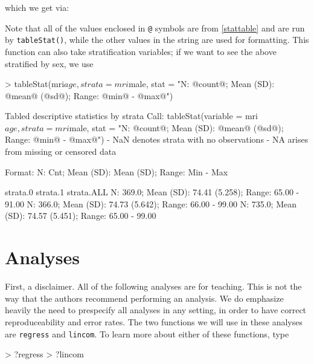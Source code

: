 \documentclass[landscape]{article}
\renewenvironment{Schunk}{\vspace{\topsep}}{\vspace{\topsep}}
\begin{document}
which we get via:
\begin{Schunk}
\end{Schunk}

Note that all of the values enclosed in \texttt{@} symbols are from \ref{stattable} and are run by \texttt{tableStat()}, while the other values in the string are used for formatting. This function can also take stratification variables; if we want to see the above stratified by sex, we use
\begin{Schunk}
\begin{Sinput}
> tableStat(mri$age, strata = mri$male, stat = "N: @count@; Mean (SD): @mean@ (@sd@); Range: @min@ - @max@")
\end{Sinput}
\begin{Soutput}
Tabled descriptive statistics by strata
Call:
      tableStat(variable = mri$age, strata = mri$male, stat = "N: @count@; Mean (SD): @mean@ (@sd@); Range: @min@ - @max@") 
            - NaN denotes strata with no observations
            - NA arises from missing or censored data

Format:  N: Cnt; Mean (SD): Mean (SD); Range: Min - Max 

                                                strata.0                                                 strata.1                                               strata.ALL 
N: 369.0; Mean (SD): 74.41 (5.258); Range: 65.00 - 91.00 N: 366.0; Mean (SD): 74.73 (5.642); Range: 66.00 - 99.00 N: 735.0; Mean (SD): 74.57 (5.451); Range: 65.00 - 99.00 
\end{Soutput}
\end{Schunk}


\section{Analyses}
First, a disclaimer. All of the following analyses are for teaching. This is not the way that the authors recommend performing an analysis. We do emphasize heavily the need to prespecify all analyses in any setting, in order to have correct reproduceability and error rates. The two functions we will use in these analyses are \texttt{regress} and \texttt{lincom}. To learn more about either of these functions, type
\begin{Schunk}
\begin{Sinput}
> ?regress
> ?lincom
\end{Sinput}
\end{Schunk}
\end{document}

